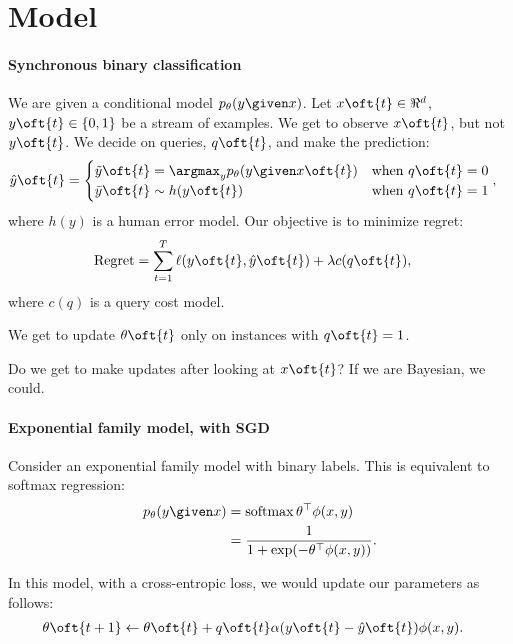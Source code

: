 \section{Model}
\label{sec:model}

\paragraph{Synchronous binary classification}

We are given a conditional model $p_\theta(y \given x)$. %
Let $x\oft{t} \in \Re^d$, $y\oft{t} \in \{0,1\}$ be a stream of examples. 
We get to observe $x\oft{t}$, but not $y\oft{t}$. 
We decide on queries, $q\oft{t}$, and make the prediction:
\begin{align*}
  \yt\oft{t} &= 
  \begin{cases}
    \yo\oft{t} = \argmax_y p_\theta(y \given x\oft{t}) & \text{when}~ q\oft{t} = 0 \\
    \yh\oft{t} \sim h(y\oft{t}) & \text{when}~ q\oft{t} = 1
  \end{cases},
\end{align*}
where $h(y)$ is a human error model.
Our objective is to minimize regret:
\begin{align*}
  \Regret &= \sum_{t=1}^T \ell(y\oft{t}, \yt\oft{t}) + \lambda c(q\oft{t}),
\end{align*}
where $c(q)$ is a query cost model.

We get to update $\theta\oft{t}$ only on instances with $q\oft{t} = 1$.

Do we get to make updates after looking at $x\oft{t}$? If we are Bayesian, we could.

\paragraph{Exponential family model, with SGD}

Consider an exponential family model with binary labels. This is equivalent to softmax regression:
\begin{align*}
p_\theta(y \given x) 
&= \softmax{\theta^\top \phi(x,y)} \\
&=  \frac{1}{1 + \exp(-\theta^\top \phi(x,y))}.
\end{align*}

In this model, with a cross-entropic loss, we would update our
parameters as follows:
\begin{align*}
  \theta\oft{t+1} &\gets \theta\oft{t} + q\oft{t} \alpha (y\oft{t} - \yt\oft{t}) \phi(x,y).
\end{align*}

